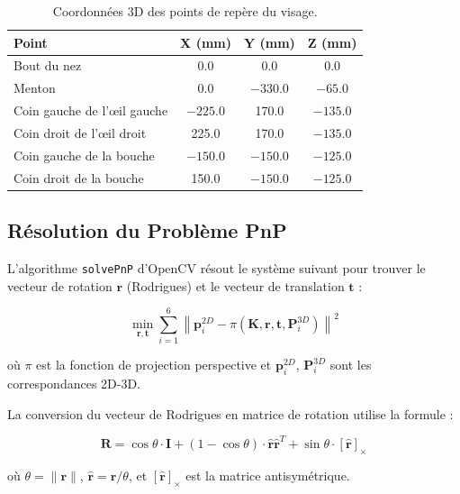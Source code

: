 \begin{table}[H]
\centering
\caption{Coordonnées 3D des points de repère du visage.}
\label{tab:3d_landmarks}
\renewcommand{\arraystretch}{1.3}
\begin{tabular}{|l|c|c|c|}
\hline
\rowcolor{stellantisblue!15}
\textbf{Point} & \textbf{X (mm)} & \textbf{Y (mm)} & \textbf{Z (mm)} \\
\hline
Bout du nez & 0.0 & 0.0 & 0.0 \\
\hline
Menton & 0.0 & $-330.0$ & $-65.0$ \\
\hline
Coin gauche de l'œil gauche & $-225.0$ & 170.0 & $-135.0$ \\
\hline
Coin droit de l'œil droit & 225.0 & 170.0 & $-135.0$ \\
\hline
Coin gauche de la bouche & $-150.0$ & $-150.0$ & $-125.0$ \\
\hline
Coin droit de la bouche & 150.0 & $-150.0$ & $-125.0$ \\
\hline
\end{tabular}
\end{table}

\subsection{Résolution du Problème PnP}

L'algorithme \texttt{solvePnP} d'OpenCV résout le système suivant pour trouver le vecteur de rotation $\mathbf{r}$ (Rodrigues) et le vecteur de translation $\mathbf{t}$ :

\begin{equation}
\min_{\mathbf{r}, \mathbf{t}} \sum_{i=1}^{6} \left\| \mathbf{p}_i^{2D} - \pi(\mathbf{K}, \mathbf{r}, \mathbf{t}, \mathbf{P}_i^{3D}) \right\|^2
\label{eq:pnp_optimization}
\end{equation}

où $\pi$ est la fonction de projection perspective et $\mathbf{p}_i^{2D}$, $\mathbf{P}_i^{3D}$ sont les correspondances 2D-3D.

La conversion du vecteur de Rodrigues en matrice de rotation utilise la formule :

\begin{equation}
\mathbf{R} = \cos\theta \cdot \mathbf{I} + (1 - \cos\theta) \cdot \hat{\mathbf{r}} \hat{\mathbf{r}}^T + \sin\theta \cdot [\hat{\mathbf{r}}]_\times
\label{eq:rodrigues}
\end{equation}

où $\theta = \|\mathbf{r}\|$, $\hat{\mathbf{r}} = \mathbf{r}/\theta$, et $[\hat{\mathbf{r}}]_\times$ est la matrice antisymétrique.


